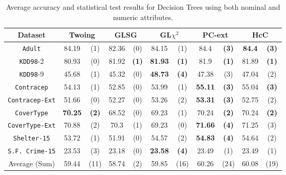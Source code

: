 \begin{table}
\small
\centering
\begin{tabular}{c|cc|cc|cc|cc|cc} 
Dataset            &\multicolumn{2}{c|}{Twoing} & \multicolumn{2}{c|}{GLSG} & \multicolumn{2}{c|}{GL$\chi^2$} & \multicolumn{2}{c|}{PC-ext}& \multicolumn{2}{c}{HcC} \\
\hline   
{\tt Adult}        & 84.19          & (1)       & 82.36      & (0)          &  84.15      &  (1)              & 84.4        & {\bf (3)}    & {\bf 84.4 } & {\bf (3)} \\
{\tt KDD98}-2      & 80.93          & (0)       & 81.92      & {\bf (1)}    & {\bf 81.93} &  {\bf (1)}        & 81.9        & {\bf (1)}    & 81.89       & {\bf (1)} \\ 
{\tt KDD98}-9      & 45.68          & (1)       & 45.32      & (0)          & {\bf 48.73} & {\bf (4)}         &  47.38      & (3)          & 47.04       & (2)       \\ 
{\tt Contracep}    & 54.13          & (1)       & 52.85      & (0)          & 53.99       & (1)               & {\bf 55.11} & {\bf (3)}    & 55.04       & {\bf (3)} \\  
{\tt Contracep-Ext}& 51.66          & (0)       & 52.27      & (0)          & 53.26       & (2)               & {\bf 53.31} & {\bf (3)}    & 52.75       & (2)       \\ 
{\tt CoverType}    & {\bf 70.25}    & {\bf (2)} & 68.52      & (0)          & 69.23       & (1)               &  70.24      & {\bf (2)}    & 70.24       & {\bf (2)} \\  
{\tt CoverType-Ext}& 70.88          & (2)       & 70.3       & (1)          & 69.23       & (0)               & {\bf 71.66} & {\bf (4)}    & 71.25       & (3)       \\ 
{\tt Shelter-15}   & 53.72          & (1)       & 51.91      & (0)          & 54.57       & (2)               & {\bf 54.83} & {\bf (4)}    & 54.64       & (2)       \\   
{\tt S.F. Crime-15}& 23.53          & (3)       & 23.18      & (0)          & {\bf 23.58} & {\bf (4)}         & 23.49       & (1)          & 23.49       & (1)       \\ 
\hline
Average (Sum)      & 59.44          & (11)      & 58.74      & (2)          & 59.85       & (16)              & 60.26       & (24)         & 60.08       & (19)

\end{tabular}
\caption{Average accuracy and statistical test results for  Decision Trees using both nominal and numeric attributes.}
\label{exp:numeric-5}
\normalsize
\end{table}


